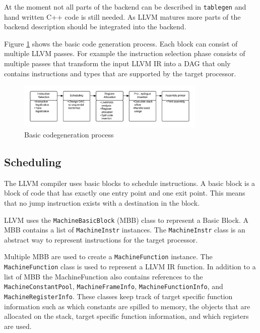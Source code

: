 At the moment not all parts of the backend can be described in \texttt{tablegen} and hand written C++ code is still needed. As LLVM matures more parts of the backend description should be integrated into the backend. 

Figure \ref{fig:codegen_process} shows the basic code generation process. Each block can consist of multiple LLVM passes. For example the instruction selection phase consists of multiple passes that transform the input LLVM IR into a DAG that only contains instructions and types that are supported by the target processor.
\begin{figure}[ht]
\centering
\includegraphics[width=0.8\textwidth]{2_background/img/Codegen.png}
\caption{Basic codegeneration process}
\label{fig:codegen_process}
\end{figure}

\subsection{Scheduling} %
\label{sub:scheduling}
The LLVM compiler uses basic blocks to schedule instructions. A basic block is a block of code that has exactly one entry point and one exit point. This means that no jump instruction exists with a destination in the block. 

LLVM uses the \texttt{MachineBasicBlock} (MBB) class to represent a Basic Block. A MBB contains a list of \texttt{MachineInstr} instances. The \texttt{MachineInstr} class is an abstract way to represent instructions for the target processor.

Multiple MBB are used to create a \texttt{MachineFunction} instance. The \texttt{MachineFunction} class is used to represent a LLVM IR function. In addition to a list of MBB the MachineFunction also contains references to the \texttt{MachineConstantPool}, \texttt{MachineFrameInfo}, \texttt{MachineFunctionInfo}, and \texttt{MachineRegisterInfo}. These classes keep track of target specific function information such as which constants are spilled to memory, the objects that are allocated on the stack, target specific function information, and which registers are used. 


